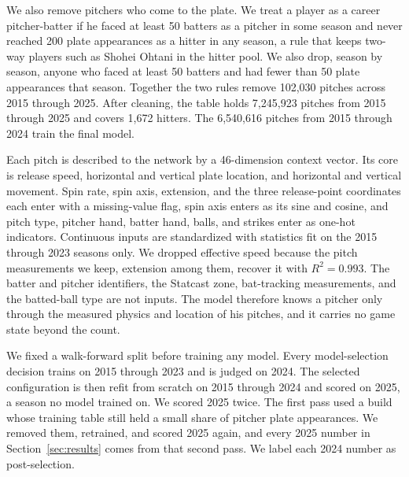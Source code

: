 \documentclass[11pt,letterpaper]{article}
\begin{document}
We also remove pitchers who come to the plate. We treat a player as a career pitcher-batter if he faced at least 50 batters as a pitcher in some season and never reached 200 plate appearances as a hitter in any season, a rule that keeps two-way players such as Shohei Ohtani in the hitter pool. We also drop, season by season, anyone who faced at least 50 batters and had fewer than 50 plate appearances that season. Together the two rules remove 102,030 pitches across 2015 through 2025. After cleaning, the table holds 7,245,923 pitches from 2015 through 2025 and covers 1,672 hitters. The 6,540,616 pitches from 2015 through 2024 train the final model.

Each pitch is described to the network by a 46-dimension context vector. Its core is release speed, horizontal and vertical plate location, and horizontal and vertical movement. Spin rate, spin axis, extension, and the three release-point coordinates each enter with a missing-value flag, spin axis enters as its sine and cosine, and pitch type, pitcher hand, batter hand, balls, and strikes enter as one-hot indicators. Continuous inputs are standardized with statistics fit on the 2015 through 2023 seasons only. We dropped effective speed because the pitch measurements we keep, extension among them, recover it with $R^2 = 0.993$. The batter and pitcher identifiers, the Statcast zone, bat-tracking measurements, and the batted-ball type are not inputs. The model therefore knows a pitcher only through the measured physics and location of his pitches, and it carries no game state beyond the count.

We fixed a walk-forward split before training any model. Every model-selection decision trains on 2015 through 2023 and is judged on 2024. The selected configuration is then refit from scratch on 2015 through 2024 and scored on 2025, a season no model trained on. We scored 2025 twice. The first pass used a build whose training table still held a small share of pitcher plate appearances. We removed them, retrained, and scored 2025 again, and every 2025 number in Section~\ref{sec:results} comes from that second pass. We label each 2024 number as post-selection.
\end{document}
